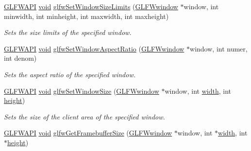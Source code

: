 \begin{DoxyCompactItemize}
\mbox{\hyperlink{glfw3_8h_a56da5036b2cc259351ae22fd6439bb47}{G\+L\+F\+W\+A\+PI}} \mbox{\hyperlink{glad_8h_a950fc91edb4504f62f1c577bf4727c29}{void}} \mbox{\hyperlink{group__window_ga8af814fc98d786d1de2505b40b707de8}{glfw\+Set\+Window\+Size\+Limits}} (\mbox{\hyperlink{group__window_ga3c96d80d363e67d13a41b5d1821f3242}{G\+L\+F\+Wwindow}} $\ast$window, int minwidth, int minheight, int maxwidth, int maxheight)
\begin{DoxyCompactList}\small\item\em Sets the size limits of the specified window. \end{DoxyCompactList}\item 
\mbox{\hyperlink{glfw3_8h_a56da5036b2cc259351ae22fd6439bb47}{G\+L\+F\+W\+A\+PI}} \mbox{\hyperlink{glad_8h_a950fc91edb4504f62f1c577bf4727c29}{void}} \mbox{\hyperlink{group__window_gad2ae94a2c5ee1c46a36e13a8f4ac68ac}{glfw\+Set\+Window\+Aspect\+Ratio}} (\mbox{\hyperlink{group__window_ga3c96d80d363e67d13a41b5d1821f3242}{G\+L\+F\+Wwindow}} $\ast$window, int numer, int denom)
\begin{DoxyCompactList}\small\item\em Sets the aspect ratio of the specified window. \end{DoxyCompactList}\item 
\mbox{\hyperlink{glfw3_8h_a56da5036b2cc259351ae22fd6439bb47}{G\+L\+F\+W\+A\+PI}} \mbox{\hyperlink{glad_8h_a950fc91edb4504f62f1c577bf4727c29}{void}} \mbox{\hyperlink{group__window_gae54d1f4915ded15e267ddd3f41496cd2}{glfw\+Set\+Window\+Size}} (\mbox{\hyperlink{group__window_ga3c96d80d363e67d13a41b5d1821f3242}{G\+L\+F\+Wwindow}} $\ast$window, int \mbox{\hyperlink{glad_8h_a09012ea95ebbbe1c032db7c68b54291e}{width}}, int \mbox{\hyperlink{glad_8h_a456943498a720df0f4b62bafa5dad93c}{height}})
\begin{DoxyCompactList}\small\item\em Sets the size of the client area of the specified window. \end{DoxyCompactList}\item 
\mbox{\hyperlink{glfw3_8h_a56da5036b2cc259351ae22fd6439bb47}{G\+L\+F\+W\+A\+PI}} \mbox{\hyperlink{glad_8h_a950fc91edb4504f62f1c577bf4727c29}{void}} \mbox{\hyperlink{group__window_gaf7d17f3534b4b6dc9a6f905e3a240b7e}{glfw\+Get\+Framebuffer\+Size}} (\mbox{\hyperlink{group__window_ga3c96d80d363e67d13a41b5d1821f3242}{G\+L\+F\+Wwindow}} $\ast$window, int $\ast$\mbox{\hyperlink{glad_8h_a09012ea95ebbbe1c032db7c68b54291e}{width}}, int $\ast$\mbox{\hyperlink{glad_8h_a456943498a720df0f4b62bafa5dad93c}{height}})

\end{DoxyCompactItemize}
